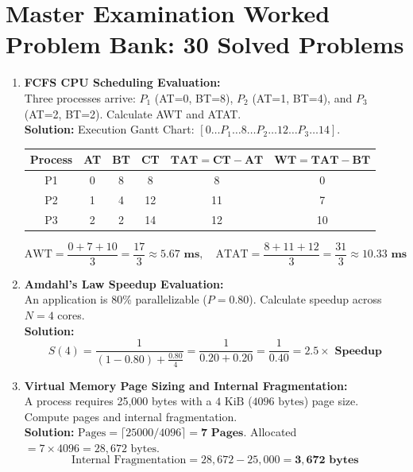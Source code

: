 \section{Master Examination Worked Problem Bank: 30 Solved Problems}
\label{sec:os_master_problem_bank}

\begin{enumerate}[label=\textbf{Problem \arabic*.},leftmargin=1.5cm]
\item \textbf{FCFS CPU Scheduling Evaluation:} \\
Three processes arrive: $P_1$ (AT=0, BT=8), $P_2$ (AT=1, BT=4), and $P_3$ (AT=2, BT=2). Calculate AWT and ATAT. \\
\textbf{Solution:} Execution Gantt Chart: $[0 \dots P_1 \dots 8 \dots P_2 \dots 12 \dots P_3 \dots 14]$.
\begin{center}
\begin{tabular}{c c c c c c}
\toprule
\textbf{Process} & \textbf{AT} & \textbf{BT} & \textbf{CT} & $\mathbf{TAT = CT - AT}$ & $\mathbf{WT = TAT - BT}$ \\
\midrule
P1 & 0 & 8 & 8 & 8 & 0 \\
P2 & 1 & 4 & 12 & 11 & 7 \\
P3 & 2 & 2 & 14 & 12 & 10 \\
\bottomrule
\end{tabular}
\end{center}
\[
\text{AWT} = \frac{0 + 7 + 10}{3} = \frac{17}{3} \approx \mathbf{5.67\text{ ms}}, \quad \text{ATAT} = \frac{8 + 11 + 12}{3} = \frac{31}{3} \approx \mathbf{10.33\text{ ms}}
\]

\item \textbf{Amdahl's Law Speedup Evaluation:} \\
An application is 80\% parallelizable ($P = 0.80$). Calculate speedup across $N = 4$ cores. \\
\textbf{Solution:}
\[
S(4) = \frac{1}{(1 - 0.80) + \frac{0.80}{4}} = \frac{1}{0.20 + 0.20} = \frac{1}{0.40} = \mathbf{2.5\times\text{ Speedup}}
\]

\item \textbf{Virtual Memory Page Sizing and Internal Fragmentation:} \\
A process requires 25,000 bytes with a $4\text{ KiB}$ ($4096\text{ bytes}$) page size. Compute pages and internal fragmentation. \\
\textbf{Solution:} $\text{Pages} = \lceil 25000 / 4096 \rceil = \mathbf{7\text{ Pages}}$. Allocated $= 7 \times 4096 = 28,672\text{ bytes}$.
\[
\text{Internal Fragmentation} = 28,672 - 25,000 = \mathbf{3,672\text{ bytes}}
\]


\end{enumerate}
